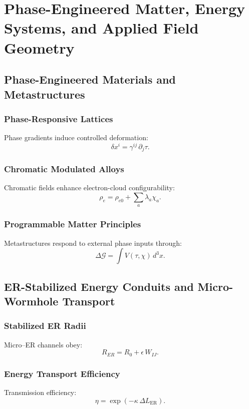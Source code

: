 

\part{Phase-Engineered Matter, Energy Systems, and Applied Field Geometry}

\chapter{Phase-Engineered Materials and Metastructures}

\section{Phase-Responsive Lattices}
Phase gradients induce controlled deformation:
\[
\delta x^i = \gamma^{ij}\,\partial_j \tau.
\]

\section{Chromatic Modulated Alloys}
Chromatic fields enhance electron-cloud configurability:
\[
\rho_e = \rho_{e0} + \sum_a \lambda_a \chi_a.
\]

\section{Programmable Matter Principles}
Metastructures respond to external phase inputs through:
\[
\Delta \mathcal{G} = \int V(\tau,\chi)\, d^3x.
\]

\chapter{ER-Stabilized Energy Conduits and Micro-Wormhole Transport}

\section{Stabilized ER Radii}
Micro–ER channels obey:
\[
R_{ER} = R_0 + \epsilon\, W_{IJ}.
\]

\section{Energy Transport Efficiency}
Transmission efficiency:
\[
\eta = \exp(-\kappa\, \Delta L_{\mathrm{ER}}).
\]

